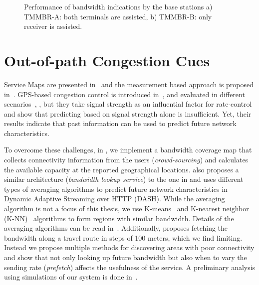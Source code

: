 \begin{figure}
  \centerline{
  }
  \caption{Performance of bandwidth indications by the base stations a)
  TMMBR-A: both terminals are assisted, b) TMMBR-B: only receiver is
  assisted.}
  \label{fig:tmmbn}
\end{figure}


\section{Out-of-path Congestion Cues}


Service Maps are presented in~\cite{1630563} and the measurement based
approach is proposed in~\cite{Aravinda:2008p14}. GPS-based congestion control
is introduced in~\cite{Yao:2008p21}, and evaluated in different
scenarios~\cite{Yao:2009p57}, \cite{Yao:2010p64}, but they take signal
strength as an influential factor for rate-control and show that predicting
based on signal strength alone is insufficient. Yet, their results indicate
that past information can be used to predict future network characteristics.

To overcome these challenges, in , we implement a bandwidth
coverage map that collects connectivity information from the users
(\emph{crowd-sourcing}) and calculates the available capacity at the reported
geographical locations. \cite{6012045} also proposes a similar architecture
(\emph{bandwidth lookup service}) to the one in  and uses
different types of averaging algorithms to predict future network
characteristics in Dynamic Adaptive Streaming over HTTP (DASH). While the
averaging algorithm is not a focus of this thesis, we use
K-means~\cite{Kanungo:2002:LSA:513400.513402} and K-nearest neighbor
(K-NN)~\cite{Iwerks:2003:CKN:1315451.1315496} algorithms to form regions with
similar bandwidth. Details of the averaging algorithms can be read
in~\cite{sharmistha-thesis}. Additionally, \cite{Riiser:2012:2240136} proposes
fetching the bandwidth along a travel route in steps of 100 meters, which we
find limiting. Instead we propose multiple methods for discovering areas with
poor connectivity and show that not only looking up future bandwidth but also
when to vary the sending rate (\emph{prefetch}) affects the usefulness of the
service. A preliminary analysis using simulations of our system is done
in~\cite{Curcio:glass}.

